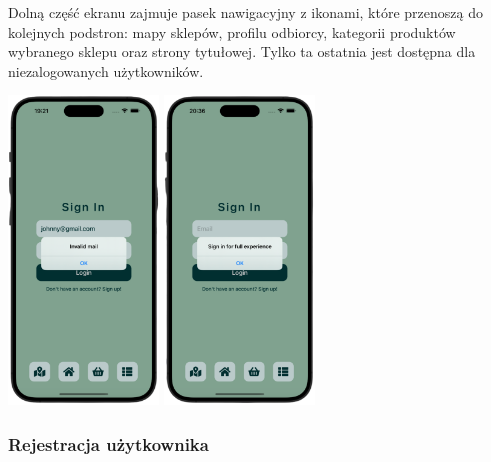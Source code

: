 Dolną część ekranu zajmuje pasek nawigacyjny z ikonami, które przenoszą do kolejnych podstron: mapy sklepów, profilu odbiorcy, kategorii produktów wybranego sklepu oraz strony tytułowej. Tylko ta ostatnia jest dostępna dla niezalogowanych użytkowników.

\begin{center} 
    \includegraphics[width=0.3\textwidth]{images/front/login_invalid.png} 
    \includegraphics[width=0.3\textwidth]{images/front/login_not_signed.png} 
\end{center}

\subsubsection{Rejestracja użytkownika}

